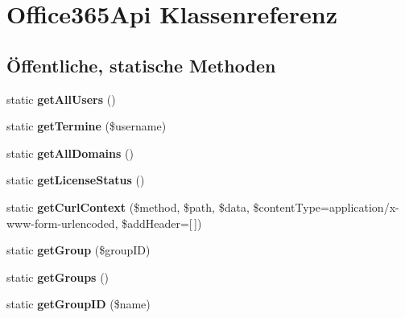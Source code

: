 \hypertarget{class_office365_api}{}\section{Office365\+Api Klassenreferenz}
\label{class_office365_api}
\subsection*{Öffentliche, statische Methoden}
\begin{DoxyCompactItemize}
\item 
\mbox{\label{class_office365_api_aef7ba624fb9653d9ab41ddd06b39f364}} 
static {\bfseries get\+All\+Users} ()
\item 
\mbox{\label{class_office365_api_a562f3539718599b449f241c6859463fe}} 
static {\bfseries get\+Termine} (\$username)
\item 
\mbox{\label{class_office365_api_a1e80f155a251ff4020669150ec418590}} 
static {\bfseries get\+All\+Domains} ()
\item 
\mbox{\label{class_office365_api_aad24a7cf9cb2debf43abba334eb76844}} 
static {\bfseries get\+License\+Status} ()
\item 
\mbox{\label{class_office365_api_a462e79e067e67c75fe8fafdabdcfc4fd}} 
static {\bfseries get\+Curl\+Context} (\$method, \$path, \$data, \$content\+Type=\textquotesingle{}application/x-\/www-\/form-\/urlencoded\textquotesingle{}, \$add\+Header=\mbox{[}$\,$\mbox{]})
\item 
\mbox{\label{class_office365_api_a408a741e50ce6e516618e64c24169972}} 
static {\bfseries get\+Group} (\$group\+ID)
\item 
\mbox{\label{class_office365_api_ab767ab6e5f12a7615a26b1a10804d6c2}} 
static {\bfseries get\+Groups} ()
\item 
\mbox{\label{class_office365_api_a05f990835311745c221fdbbf5fa8704b}} 
static {\bfseries get\+Group\+ID} (\$name)
\item 
\mbox{\label{class_office365_api_a2c546c5f24a0425f243a564cab407b48}} 

\end{DoxyCompactItemize}
